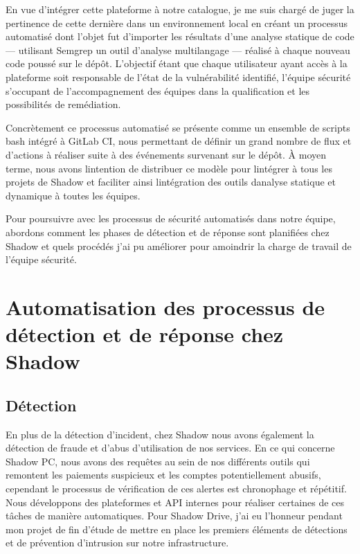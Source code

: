 \documentclass[
  11pt,
  a4paper,
  krantz2,
  11pt,
  oneside]{krantz}
\begin{document}
En vue d'intégrer cette plateforme à notre catalogue, je me suis chargé de juger la pertinence de cette dernière dans un environnement local en créant un processus automatisé dont l'objet fut d'importer les résultats d'une analyse statique de code --- utilisant Semgrep un outil d'analyse multilangage --- réalisé à chaque nouveau code poussé sur le dépôt. L'objectif étant que chaque utilisateur ayant accès à la plateforme soit responsable de l'état de la vulnérabilité identifié, l'équipe sécurité s'occupant de l'accompagnement des équipes dans la qualification et les possibilités de remédiation.

Concrètement ce processus automatisé se présente comme un ensemble de scripts bash intégré à GitLab CI, nous permettant de définir un grand nombre de flux et d'actions à réaliser suite à des événements survenant sur le dépôt. À moyen terme, nous avons l\textquotesingle intention de distribuer ce modèle pour l\textquotesingle intégrer à tous les projets de Shadow et faciliter ainsi l\textquotesingle intégration des outils d\textquotesingle analyse statique et dynamique à toutes les équipes.

Pour poursuivre avec les processus de sécurité automatisés dans notre équipe, abordons comment les phases de détection et de réponse sont planifiées chez Shadow et quels procédés j'ai pu améliorer pour amoindrir la charge de travail de l'équipe sécurité.

\section{Automatisation des processus de détection et de réponse chez Shadow}\label{automatisation-des-processus-de-duxe9tection-et-de-ruxe9ponse-chez-shadow}

\subsection{Détection}\label{duxe9tection}

En plus de la détection d'incident, chez Shadow nous avons également la détection de fraude et d'abus d'utilisation de nos services. En ce qui concerne Shadow PC, nous avons des requêtes au sein de nos différents outils qui remontent les paiements suspicieux et les comptes potentiellement abusifs, cependant le processus de vérification de ces alertes est chronophage et répétitif. Nous développons des plateformes et API internes pour réaliser certaines de ces tâches de manière automatiques. Pour Shadow Drive, j'ai eu l'honneur pendant mon projet de fin d'étude de mettre en place les premiers éléments de détections et de prévention d'intrusion sur notre infrastructure.
\end{document}
